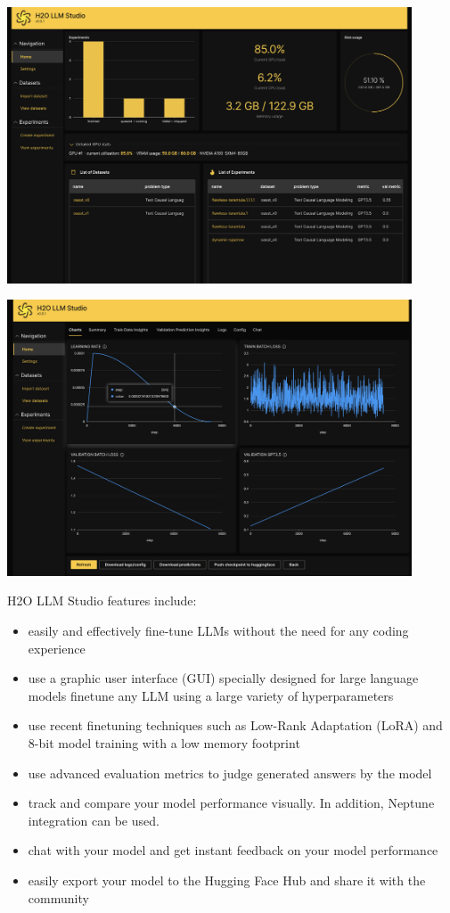 \documentclass{article}
\begin{document}
\begin{center}
  \includegraphics[width=0.9\textwidth]{images/llmstudio1.png}
  
  \includegraphics[width=0.9\textwidth]{images/llmstudio2.png}
\end{center}


H2O LLM Studio features include:
\begin{itemize}
    \item easily and effectively fine-tune LLMs without the need for any coding experience
    \item use a graphic user interface (GUI) specially designed for large language models
    finetune any LLM using a large variety of hyperparameters
    \item use recent finetuning techniques such as Low-Rank Adaptation (LoRA) and 8-bit model training with a low memory footprint
    \item use advanced evaluation metrics to judge generated answers by the model
    \item track and compare your model performance visually. In addition, Neptune integration can be used.
    \item chat with your model and get instant feedback on your model performance
    \item easily export your model to the Hugging Face Hub and share it with the community
\end{itemize}
\end{document}
